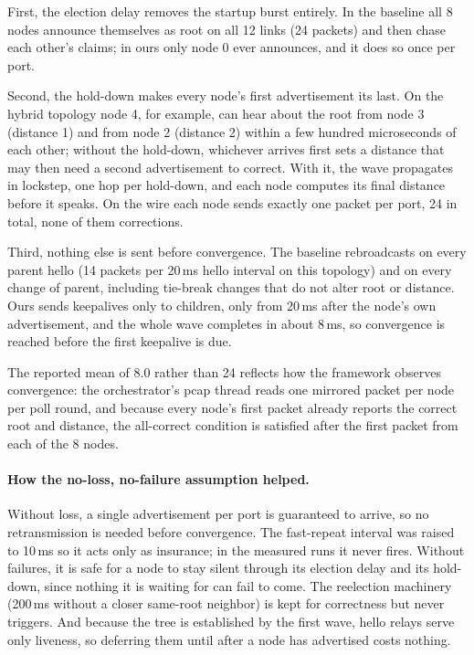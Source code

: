 \documentclass[11pt]{article}
\begin{document}
First, the election delay removes the startup burst entirely.
In the baseline all 8 nodes announce themselves as root on all 12 links (24 packets) and then chase each other's claims; in ours only node 0 ever announces, and it does so once per port.

Second, the hold-down makes every node's first advertisement its last.
On the hybrid topology node 4, for example, can hear about the root from node 3 (distance 1) and from node 2 (distance 2) within a few hundred microseconds of each other; without the hold-down, whichever arrives first sets a distance that may then need a second advertisement to correct.
With it, the wave propagates in lockstep, one hop per hold-down, and each node computes its final distance before it speaks.
On the wire each node sends exactly one packet per port, 24 in total, none of them corrections.

Third, nothing else is sent before convergence.
The baseline rebroadcasts on every parent hello (14 packets per 20\,ms hello interval on this topology) and on every change of parent, including tie-break changes that do not alter root or distance.
Ours sends keepalives only to children, only from 20\,ms after the node's own advertisement, and the whole wave completes in about 8\,ms, so convergence is reached before the first keepalive is due.

The reported mean of 8.0 rather than 24 reflects how the framework observes convergence: the orchestrator's pcap thread reads one mirrored packet per node per poll round, and because every node's first packet already reports the correct root and distance, the all-correct condition is satisfied after the first packet from each of the 8 nodes.

\paragraph{How the no-loss, no-failure assumption helped.}
Without loss, a single advertisement per port is guaranteed to arrive, so no retransmission is needed before convergence.
The fast-repeat interval was raised to 10\,ms so it acts only as insurance; in the measured runs it never fires.
Without failures, it is safe for a node to stay silent through its election delay and its hold-down, since nothing it is waiting for can fail to come.
The reelection machinery (200\,ms without a closer same-root neighbor) is kept for correctness but never triggers.
And because the tree is established by the first wave, hello relays serve only liveness, so deferring them until after a node has advertised costs nothing.
\end{document}
